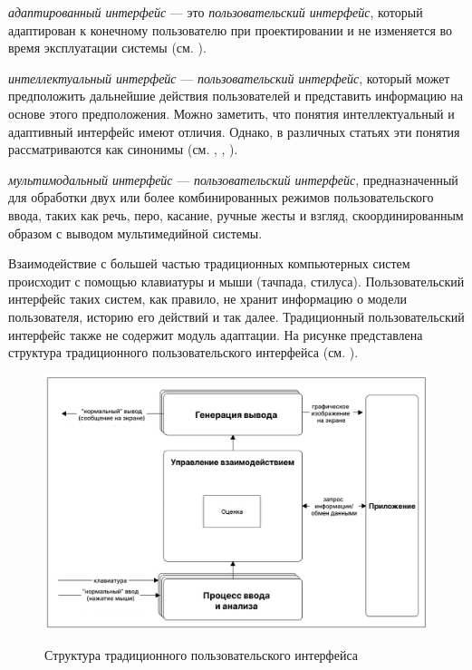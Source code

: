 \textit{адаптированный интерфейс} --- это \textit{пользовательский интерфейс}, который адаптирован к конечному пользователю при проектировании и не изменяется во время эксплуатации системы (см. ).

\textit{интеллектуальный интерфейс} --- \textit{пользовательский интерфейс}, который может предположить дальнейшие действия пользователей и представить информацию на основе этого предположения. Можно заметить, что понятия интеллектуальный и адаптивный интерфейс имеют отличия. Однако, в различных статьях эти понятия рассматриваются как синонимы (см. , , ).

\textit{мультимодальный интерфейс} --- \textit{пользовательский интерфейс}, предназначенный для обработки двух или более комбинированных режимов пользовательского ввода, таких как речь, перо, касание, ручные жесты и взгляд, скоординированным образом с выводом мультимедийной системы.

Взаимодействие с большей частью традиционных компьютерных систем происходит с помощью клавиатуры и мыши (тачпада, стилуса). Пользовательский интерфейс таких систем, как правило, не хранит информацию о модели пользователя, историю его действий и так далее. Традиционный пользовательский интерфейс также не содержит модуль адаптации. На рисунке  представлена структура традиционного пользовательского интерфейса (см. ).

\begin{figure}[H]
	\centering
	\caption{Структура традиционного пользовательского интерфейса}
	\includegraphics[scale=0.4]{author/part4/figures/traditional_ui.png}
	\label{fig:traditional_ui}
\end{figure}

